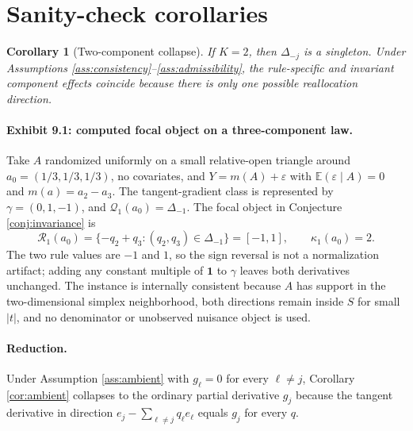 \documentclass[11pt]{article}
\newcommand{\E}{\mathbb{E}}
\newcommand{\one}{\mathbf{1}}
\theoremstyle{definition}
\theoremstyle{plain}
\newtheorem{corollary}{Corollary}
\theoremstyle{remark}
\begin{document}
\section{Sanity-check corollaries}
\begin{corollary}[Two-component collapse]\label{cor:binary}
If \(K=2\), then \(\Delta_{-j}\) is a singleton. Under Assumptions \ref{ass:consistency}--\ref{ass:admissibility}, the rule-specific and invariant component effects coincide because there is only one possible reallocation direction.
\end{corollary}

\paragraph{Exhibit 9.1: computed focal object on a three-component law.}
Take \(A\) randomized uniformly on a small relative-open triangle around \(a_0=(1/3,1/3,1/3)\), no covariates, and \(Y=m(A)+\varepsilon\) with \(\E(\varepsilon\mid A)=0\) and \(m(a)=a_2-a_3\). The tangent-gradient class is represented by \(\gamma=(0,1,-1)\), and \(\mathcal{Q}_1(a_0)=\Delta_{-1}\). The focal object in Conjecture \ref{conj:invariance} is
\[
\mathcal{R}_1(a_0)=\{-q_2+q_3:(q_2,q_3)\in\Delta_{-1}\}=[-1,1],\qquad
\kappa_1(a_0)=2.
\]
The two rule values are \(-1\) and \(1\), so the sign reversal is not a normalization artifact; adding any constant multiple of \(\one\) to \(\gamma\) leaves both derivatives unchanged. The instance is internally consistent because \(A\) has support in the two-dimensional simplex neighborhood, both directions remain inside \(S\) for small \(|t|\), and no denominator or unobserved nuisance object is used.

\paragraph{Reduction.}
Under Assumption \ref{ass:ambient} with \(g_\ell=0\) for every \(\ell\neq j\), Corollary \ref{cor:ambient} collapses to the ordinary partial derivative \(g_j\) because the tangent derivative in direction \(e_j-\sum_{\ell\neq j}q_\ell e_\ell\) equals \(g_j\) for every \(q\).
\end{document}
